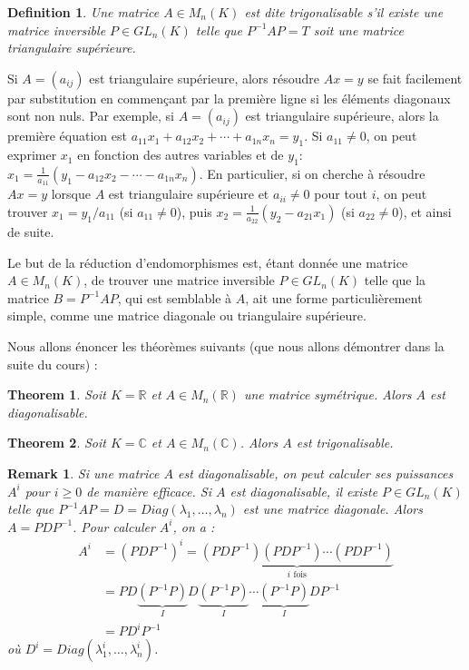\documentclass{article}
\newtheorem{theorem}{Theorem}
\newtheorem{definition}{Definition}
\newtheorem{remark}{Remark}
\begin{document}
\begin{definition}
Une matrice $A \in M_n(K)$ est dite trigonalisable s'il existe une matrice inversible $P \in GL_n(K)$ telle que $P^{-1}AP = T$ soit une matrice triangulaire supérieure.
\end{definition}

Si $A = (a_{ij})$ est triangulaire supérieure, alors résoudre $Ax=y$ se fait facilement par substitution en commençant par la première ligne si les éléments diagonaux sont non nuls. Par exemple, si $A = (a_{ij})$ est triangulaire supérieure, alors la première équation est $a_{11}x_1 + a_{12}x_2 + \cdots + a_{1n}x_n = y_1$. Si $a_{11} \neq 0$, on peut exprimer $x_1$ en fonction des autres variables et de $y_1$: $x_1 = \frac{1}{a_{11}} (y_1 - a_{12}x_2 - \cdots - a_{1n}x_n)$.  En particulier, si on cherche à résoudre $Ax=y$ lorsque $A$ est triangulaire supérieure et $a_{ii} \ne 0$ pour tout $i$, on peut trouver $x_1 = y_1/a_{11}$ (si $a_{11} \ne 0$), puis $x_2 = \frac{1}{a_{22}} (y_2 - a_{21} x_1)$ (si $a_{22} \ne 0$), et ainsi de suite.

Le but de la réduction d'endomorphismes est, étant donnée une matrice $A \in M_n(K)$, de trouver une matrice inversible $P \in GL_n(K)$ telle que la matrice $B = P^{-1}AP$, qui est semblable à $A$, ait une forme particulièrement simple, comme une matrice diagonale ou triangulaire supérieure.

Nous allons énoncer les théorèmes suivants (que nous allons démontrer dans la suite du cours) :

\begin{theorem}
Soit $K = \mathbb{R}$ et $A \in M_n(\mathbb{R})$ une matrice symétrique. Alors $A$ est diagonalisable.
\end{theorem}

\begin{theorem}
Soit $K = \mathbb{C}$ et $A \in M_n(\mathbb{C})$. Alors $A$ est trigonalisable.
\end{theorem}

\begin{remark}
Si une matrice $A$ est diagonalisable, on peut calculer ses puissances $A^i$ pour $i \ge 0$ de manière efficace. Si $A$ est diagonalisable, il existe $P \in GL_n(K)$ telle que $P^{-1}AP = D = Diag(\lambda_1, \ldots, \lambda_n)$ est une matrice diagonale. Alors $A = PDP^{-1}$. Pour calculer $A^i$, on a :
\begin{align*}
A^i &= (PDP^{-1})^i = \underbrace{(PDP^{-1}) (PDP^{-1}) \cdots (PDP^{-1})}_{i \text{ fois}} \\
&= PD \underbrace{(P^{-1}P)}_{I} D \underbrace{(P^{-1}P)}_{I} \cdots \underbrace{(P^{-1}P)}_{I} D P^{-1} \\
&= PD^i P^{-1}
\end{align*}
où $D^i = Diag(\lambda_1^i, \ldots, \lambda_n^i)$.
\end{remark}
\end{document}

